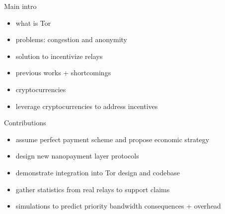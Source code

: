 Main intro

\begin{itemize}
\item what is Tor
\item problems: congestion and anonymity
\item solution to incentivize relays
\item previous works + shortcomings
\item cryptocurrencies
\item leverage cryptocurrencies to address incentives
\end{itemize}

Contributions

\begin{itemize}
\item assume perfect payment scheme and propose economic strategy
\item design new nanopayment layer protocols
\item demonstrate integration into Tor design and codebase
\item gather statistics from real relays to support claims
\item simulations to predict priority bandwidth consequences + overhead
\end{itemize}
